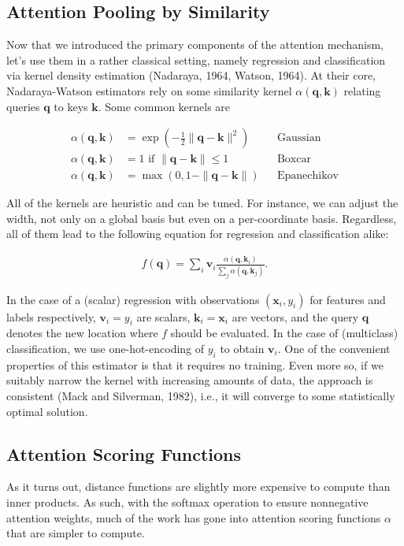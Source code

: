 \documentclass[a4paper,12pt]{article}
\theoremstyle{definition}
\begin{document}
\subsection*{Attention Pooling by Similarity}
Now that we introduced the primary components of the attention mechanism, let’s use them in a rather classical setting, namely regression and classification via kernel density estimation (Nadaraya, 1964, Watson, 1964).
At their core, Nadaraya-Watson estimators rely on some similarity kernel $\alpha(\mathbf{q}, \mathbf{k})$ relating queries $\mathbf{q}$ to keys $\mathbf{k}$. Some common kernels are

\begin{align*}
    \alpha(\mathbf{q}, \mathbf{k}) & = \exp\left(-\frac{1}{2} \|\mathbf{q} - \mathbf{k}\|^2 \right)         &  & \mathrm{Gaussian}    \\
    \alpha(\mathbf{q}, \mathbf{k}) & = 1 \text{ if } \|\mathbf{q} - \mathbf{k}\| \leq 1                     &  & \mathrm{Boxcar}      \\
    \alpha(\mathbf{q}, \mathbf{k}) & = \mathop{\mathrm{max}}\left(0, 1 - \|\mathbf{q} - \mathbf{k}\|\right) &  & \mathrm{Epanechikov}
\end{align*}

All of the kernels are heuristic and can be tuned. For instance, we can adjust the width, not only on a global basis but even on a per-coordinate basis. Regardless, all of them lead to the following
equation for regression and classification alike:

\begin{align*}
    f(\mathbf{q}) = \sum_i \mathbf{v}_i \frac{\alpha(\mathbf{q}, \mathbf{k}_i)}{\sum_j \alpha(\mathbf{q}, \mathbf{k}_j)}.
\end{align*}

In the case of a (scalar) regression with observations $(\mathbf{x}_i, y_i)$ for features and labels respectively, $\mathbf{v}_i = y_i$ are scalars, $\mathbf{k}_i = \mathbf{x}_i$ are vectors, and
the query $\mathbf{q}$ denotes the new location where $f$ should be evaluated. In the case of (multiclass) classification, we use one-hot-encoding of $y_i$ to obtain $\mathbf{v}_i$.
One of the convenient properties of this estimator is that it requires no training. Even more so, if we suitably narrow the kernel with increasing amounts of data, the approach is consistent (Mack and Silverman, 1982),
i.e., it will converge to some statistically optimal solution.
\subsection*{Attention Scoring Functions}
As it turns out, distance functions are slightly more expensive to compute than inner products. As such, with the softmax operation to ensure nonnegative attention weights,
much of the work has gone into attention scoring functions $\alpha$ that are simpler to compute.
\end{document}

